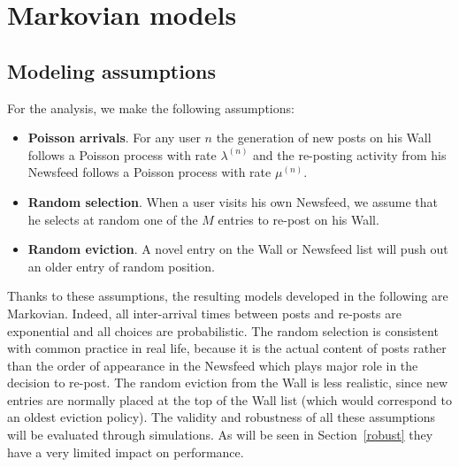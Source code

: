 \documentclass[10pt, conference, letterpaper]{IEEEtran}
\newcommand{\blue}[1]{\textcolor{blue}{#1}}
\begin{document}
\section{Markovian models}
\label{models}

\subsection{Modeling assumptions}
\label{assumptions}


For the analysis, we make the following assumptions:

\begin{itemize}

\item \textbf{Poisson arrivals}. For any user $n$ the generation of new posts on his Wall follows a Poisson process with rate $\lambda^{(n)}$ and the re-posting activity from his Newsfeed follows a Poisson process with rate $\mu^{(n)}$.

\item \textbf{Random selection}. When a user visits his own Newsfeed, we assume that he selects at random one of the $M$ entries to re-post on his Wall.

\item \textbf{Random eviction}. A novel entry on the Wall or Newsfeed list will push out an older entry of random position. 


\end{itemize}

Thanks to these assumptions, the resulting models developed in the following are Markovian. Indeed, all inter-arrival times between posts and re-posts are exponential and all choices are probabilistic. The random selection is consistent with common practice in real life, because it is the actual content of posts rather than the order of appearance in the Newsfeed which plays major role in the decision to re-post. The random eviction from the Wall is less realistic, since new entries are normally placed at the top of the Wall list (which would correspond to an oldest eviction policy). The validity and robustness of all these assumptions will be evaluated through simulations. As will be seen in Section~\ref{robust} they have a very limited impact on performance.
\end{document}
